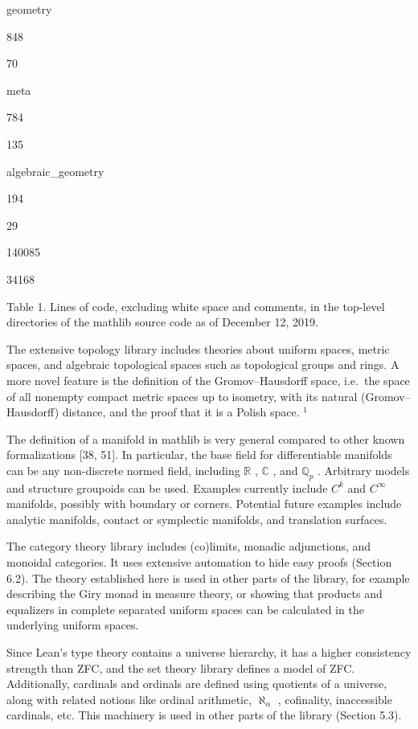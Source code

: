 \documentclass[
]{article}
\newcounter{none} %
\begin{document}
geometry

848

70

meta

784

135

algebraic\_geometry

194

29

140085

34168

Table 1. Lines of code, excluding white space and comments, in the
top-level directories of the mathlib source code as of December 12,
2019.

The extensive topology library includes theories about uniform spaces,
metric spaces, and algebraic topological spaces such as topological
groups and rings. A more novel feature is the definition of the
Gromov--Hausdorff space, i.e.~the space of all nonempty compact metric
spaces up to isometry, with its natural (Gromov--Hausdorff) distance,
and the proof that it is a Polish space. \(^{1}\)

The definition of a manifold in mathlib is very general compared to
other known formalizations {[}38, 51{]}. In particular, the base field
for differentiable manifolds can be any non-discrete normed field,
including \(\mathbb{R}\) , \(\mathbb{C}\) , and \(\mathbb{Q}_p\) .
Arbitrary models and structure groupoids can be used. Examples currently
include \(C^k\) and \(C^\infty\) manifolds, possibly with boundary or
corners. Potential future examples include analytic manifolds, contact
or symplectic manifolds, and translation surfaces.

The category theory library includes (co)limits, monadic adjunctions,
and monoidal categories. It uses extensive automation to hide easy
proofs (Section 6.2). The theory established here is used in other parts
of the library, for example describing the Giry monad in measure theory,
or showing that products and equalizers in complete separated uniform
spaces can be calculated in the underlying uniform spaces.

Since Lean's type theory contains a universe hierarchy, it has a higher
consistency strength than ZFC, and the set theory library defines a
model of ZFC. Additionally, cardinals and ordinals are defined using
quotients of a universe, along with related notions like ordinal
arithmetic, \(\aleph_{\alpha}\) , cofinality, inaccessible cardinals,
etc. This machinery is used in other parts of the library (Section 5.3).
\end{document}
